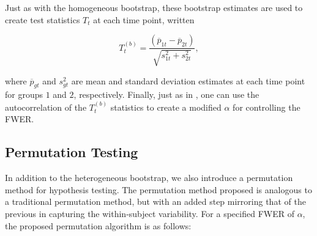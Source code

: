 Just as with the homogeneous bootstrap, these bootstrap estimates are used to create test statistics $T_t$ at each time point, written

\begin{equation}
T_t^{(b)} = \frac{(\overline{p}_{1t} - \overline{p}_{2t})}{\sqrt{s_{1t}^2 + s_{2t}^2}},
\end{equation}

where $\overline{p}_{gt}$ and $s_{gt}^2$ are mean and standard deviation estimates at each time point for groups $1$ and $2$, respectively. Finally, just as in \citet{oleson2017detecting}, one can use the autocorrelation of the $T_t^{(b)}$ statistics to create a modified $\alpha$ for controlling the FWER.



\subsection{Permutation Testing}

In addition to the heterogeneous bootstrap, we also introduce a permutation method for hypothesis testing. The permutation method proposed is analogous to a traditional permutation method, but with an added step mirroring that of the previous in capturing the within-subject variability. For a specified FWER of $\alpha$, the proposed permutation algorithm is as follows:



